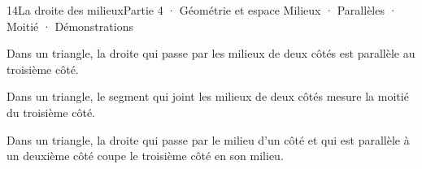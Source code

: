 \begin{ouverture}[milieux]{14}{La droite des milieux}{Partie 4 · Géométrie et espace}
{Milieux · Parallèles · Moitié · Démonstrations}
\end{ouverture}
\pagestyle{otMain}\essentiel\fontsize{11}{15}\selectfont
{}\label{cours-14-1}
\begin{theoreme}Dans un triangle, la droite qui passe par les milieux de deux côtés est parallèle au troisième côté.\end{theoreme}
\begin{theoreme}Dans un triangle, le segment qui joint les milieux de deux côtés mesure la moitié du troisième côté.\end{theoreme}
\begin{theoreme}Dans un triangle, la droite qui passe par le milieu d’un côté et qui est parallèle à un deuxième côté coupe le troisième côté en son milieu.\end{theoreme}
\label{fig-cours-14-1-cours-milieux}

